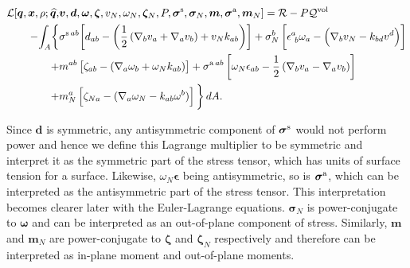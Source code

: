 \begin{align} \label{63_II}
	\mathcal{L}[ \bm{q}, \bm{x}, \rho;  \widehat{\bm{q}}, & \bm{v}, \bm{d}, \bm{\omega}, \bm{\zeta}, v_N, \omega_N, \bm{\zeta}_{N}, P, \bm{\sigma}^{\textup{s}}, \bm{\sigma}_N, \bm{m}, \bm{\sigma}^{\textup{a}}, \bm{m}_N]
	=     \mathcal{R}    - P \mathcal{Q}^{\rm vol} \\  - {\int_A} \bigg\{   & \sigma^{\textup{s}  \, ab} \bigg[ d_{ab} -   \bigg(  \frac{1}{2}\left(\nabla_b v_a + \nabla_a v_b\right) + \nonumber   v_N k_{ab} \bigg) \bigg]  + \sigma^b_N \left[\epsilon_{~b}^a \omega_a -   \left( \nabla_{b} v_N  -k_{bd}v^d \right) \right] \nonumber \\ 
	+  & m^{ab} \left[\zeta_{ab} -  \left( \nabla_a \omega_b + \omega_N k_{ab}  \right) \right]  + \sigma^{\textup{a} \, ab}\left[ \omega_N\epsilon_{ab} -   \frac{1}{2}\left(\nabla_b v_a - \nabla_a v_b\right)\right]    \nonumber \\ 
	+  & m_N^a\left[\zeta_{N a} -    (\nabla_a \omega_{N} - k_{ab} \omega^b) \right] \bigg\}  \, d A  . \nonumber
\end{align}

Since $\bm{d}$ is symmetric, any antisymmetric component of $\bm{\sigma}^{\rm s}$ would not perform power and hence we define this Lagrange multiplier to be symmetric and interpret it as the symmetric part of the stress tensor, which has units of surface tension for a surface. Likewise,  $\omega_N \bm{\epsilon}$ being antisymmetric, so is  $\bm{\sigma}^{\rm a}$, which can be interpreted as the antisymmetric part of the stress tensor. This interpretation becomes clearer later with the Euler-Lagrange equations.  $\bm{\sigma}_N$ is power-conjugate to $\bm{\omega}$ and can be interpreted as an out-of-plane component of stress. Similarly, $\bm{m}$ and $\bm{m}_N$ are power-conjugate to $\bm{\zeta}$ and $\bm{\zeta}_N$ respectively and therefore can be interpreted as in-plane moment and out-of-plane moments. 


